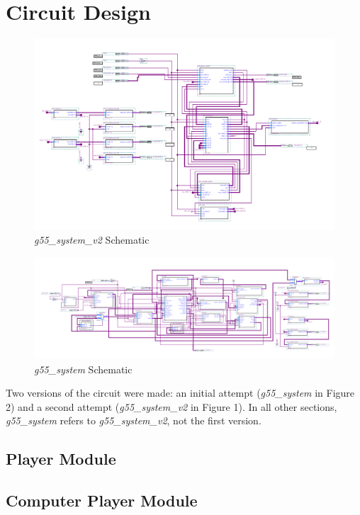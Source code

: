 \documentclass[12pt]{article}
\begin{document}
\section{Circuit Design}
\begin{figure}[H]
\centering
\includegraphics[scale = 0.45, angle=90, origin=c]{graphics/complete-circuit.png}
\caption{\textit{g55\_system\_v2} Schematic}
\end{figure}

\begin{figure}[H]
\centering
\includegraphics[scale=0.3, angle = 90, origin = c]{graphics/initial-circuit.png}
\caption{\textit{g55\_system} Schematic}
\end{figure}

Two versions of the circuit were made: an initial attempt (\textit{g55\_system} in Figure 2) and a second attempt (\textit{g55\_system\_v2} in Figure 1). In all other sections, \textit{g55\_system} refers to \textit{g55\_system\_v2}, not the first version.

\subsection{Player Module}

\subsection{Computer Player Module}
\end{document}

